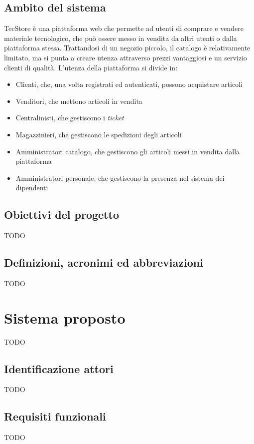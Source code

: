 \documentclass[12pt,a4paper]{article}
\begin{document}
\subsection{Ambito del sistema}
TecStore è una piattaforma web che permette ad utenti di comprare e vendere materiale tecnologico, che può essere messo in vendita da altri utenti o dalla piattaforma stessa. Trattandosi di un negozio piccolo, il catalogo è relativamente limitato, ma si punta a creare utenza attraverso prezzi vantaggiosi e un servizio clienti di qualità.
L'utenza della piattaforma si divide in:
\begin{itemize}
\item Clienti, che, una volta registrati ed autenticati, possono acquistare articoli
\item Venditori, che mettono articoli in vendita
\item Centralinisti, che gestiscono i \emph{ticket}
\item Magazzinieri, che gestiscono le spedizioni degli articoli
\item Amministratori catalogo, che gestiscono gli articoli messi in vendita dalla piattaforma
\item Amministratori personale, che gestiscono la presenza nel sistema dei dipendenti
\end{itemize}

\subsection{Obiettivi del progetto}
 TODO

\subsection{Definizioni, acronimi ed abbreviazioni}
 TODO

\section{Sistema proposto}
 TODO
 
\subsection{Identificazione attori}
 TODO
 
\subsection{Requisiti funzionali}
 TODO
\end{document}

